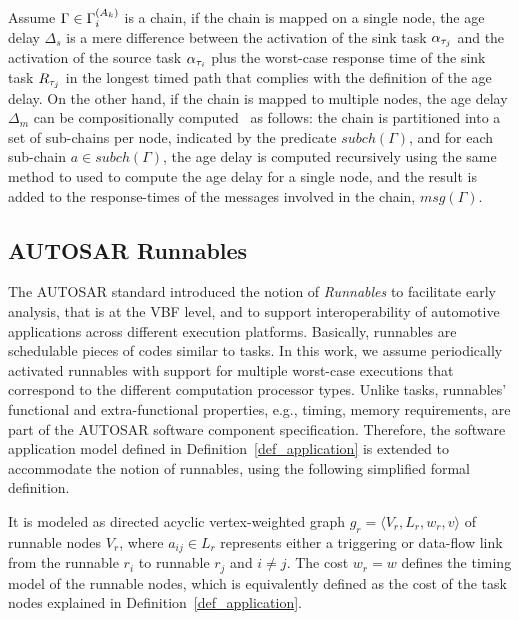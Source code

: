 Assume $\Gamma \in \sss{\Gamma}$ is a chain, if the chain is mapped on a single node, the age delay $\Delta_s$ is a mere difference between the activation of the sink task $\ssb{\alpha}[\tau_j]$ and the activation of the source task $\ssb{\alpha}[\tau_i]$ plus the worst-case response time of the sink task $\ssb{R}[\tau_j]$ in the longest timed path that complies with the definition of the age delay. On the other hand, if the chain is mapped to multiple nodes, the age delay $\Delta_m$ can be compositionally computed~\cite{Feiertag2009ASemantics} as follows: the chain is partitioned  into a set of sub-chains per node, indicated by the predicate $subch(\Gamma)$, and for each sub-chain $a\in subch(\Gamma)$, the age delay is computed recursively using the same method to used to compute the age delay for a single node, and the result is added to the response-times of the messages involved in the chain, $msg(\Gamma)$.

\subsection{AUTOSAR Runnables}\label{subsec_autosarsystem}
The AUTOSAR standard introduced the notion of \textit{Runnables} to facilitate early analysis, that is at the VBF level, and to support interoperability of automotive applications across different execution platforms. Basically, runnables are schedulable pieces of codes similar to tasks. In this work, we assume periodically activated runnables with support for multiple worst-case executions that correspond to the different computation processor types. Unlike tasks, runnables' functional and extra-functional properties, e.g., timing, memory requirements, are part of the AUTOSAR software component specification. Therefore, the software application model defined in Definition~\ref{def_application} is extended to accommodate the notion of runnables, using the following simplified formal definition.

\begin{definition}
It is modeled as directed acyclic vertex-weighted graph $g_r=\langle V_r, L_r, w_r, v\rangle$ of runnable nodes $V_r$, where $a_{ij}\in L_r$ represents either a triggering or data-flow link from the runnable $r_i$ to runnable $r_j$ and $i\neq j$. The cost $w_r=w$ defines the timing model of the runnable nodes, which is equivalently defined as the cost of the task nodes explained in Definition~\ref{def_application}.
\end{definition}

